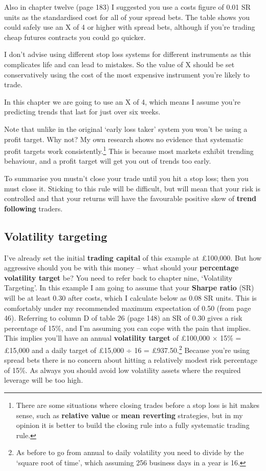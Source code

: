 Also in chapter twelve (page 183) I suggested you use a costs figure of 0.01 SR units as the standardised cost for all of your spread bets. The table shows you could safely use an X of 4 or higher with spread bets, although if you're trading cheap futures contracts you could go quicker.

I don't advise using different stop loss systems for different instruments as this complicates life and can lead to mistakes. So the value of X should be set conservatively using the cost of the most expensive instrument you're likely to trade.

In this chapter we are going to use an X of 4, which means I assume you're predicting trends that last for just over six weeks.

Note that unlike in the original ‘early loss taker' system you won't be using a profit target. Why not? My own research shows no evidence that systematic profit targets work consistently.\footnote{There are some situations where closing trades before a stop loss is hit makes sense, such as \textbf{relative value} or \textbf{mean reverting} strategies, but in my opinion it is better to build the closing rule into a fully systematic trading rule.} This is because most markets exhibit trending behaviour, and a profit target will get you out of trends too early.

To summarise you mustn't close your trade until you hit a stop loss; then you must close it. Sticking to this rule will be difficult, but will mean that your risk is controlled and that your returns will have the favourable positive skew of \textbf{trend following} traders.

\subsection*{Volatility targeting}

I've already set the initial \textbf{trading capital} of this example at £100,000. But how aggressive should you be with this money -- what should your \textbf{percentage} \textbf{volatility target} be? You need to refer back to chapter nine, ‘Volatility Targeting'. In this example I am going to assume that your \textbf{Sharpe ratio} (SR) will be at least 0.30 after costs, which I calculate below as 0.08 SR units. This is comfortably under my recommended maximum expectation of 0.50 (from page 46). Referring to column D of table 26 (page 148) an SR of 0.30 gives a risk percentage of 15\%, and I'm assuming you can cope with the pain that implies.
This implies you'll have an annual \textbf{volatility target} of £100,000 × 15\% = £15,000 and a daily target of £15,000 ÷ 16 = £937.50.\footnote{As before to go from annual to daily volatility you need to divide by the ‘square root of time’, which assuming 256 business days in a year is 16.} Because you're using spread bets there is no concern about hitting a relatively modest risk percentage of 15\%. As always you should avoid low volatility assets where the required leverage will be too high.

